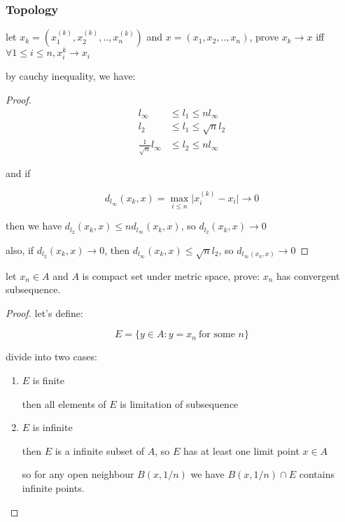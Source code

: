 \subsubsection{Topology}

\begin{exercise}
    let $x_k = (x_{1}^{(k)}, x_{2}^{(k)}, .., x_{n}^{(k)})$ and $x=(x_1,x_2, .., x_n)$, prove $x_k \to x$ iff $\forall 1 \le i \le n, x_{i}^{k} \to x_i$
\end{exercise}

by cauchy inequality, we have:

\begin{proof}
    \begin{align*}
        l_{\infty} & \le l_{1} \le nl_{\infty} \\
        l_2 & \le l_1 \le  \sqrt{n}l_2  \\
        \frac{1}{\sqrt{n}}l_{\infty} & \le l_2 \le n l_{\infty}
    \end{align*}

    and if

    \[
        d_{l_\infty}(x_k, x) = \max_{i \le n}\lvert x_i^{(k)} - x_i \rvert \to 0
    \]

    then we have $d_{l_{2}}(x_k, x) \le nd_{l_\infty}(x_k,x)$, so $d_{l_2}(x_k, x) \to 0$

    also, if $d_{l_{2}}(x_k, x) \to 0$, then $d_{l_\infty}(x_k, x) \le  \sqrt{n}l_2$, so $d_{l_\infty(x_k, x)} \to 0$

\end{proof}

\begin{exercise}
    let $x_n \in A$ and $A$ is compact set under metric space, prove: $x_n$ has convergent subsequence.
\end{exercise}

\begin{proof}
    let's define:

    \[
        E = \{ y \in A: y = x_n \: \text{for some } n\}
    \]
    
    divide into two cases:

    \begin{enumerate}
        \item $E$ is finite

        then all elements of $E$ is limitation of subsequence

        \item $E$ is infinite

        then $E$ is a infinite subset of $A$, so $E$ has at least one limit point $x \in A$

        so for any open neighbour $B(x,1/n)$ we have $B(x, 1/n) \cap E$ contains infinite points. 
    \end{enumerate}
\end{proof}


